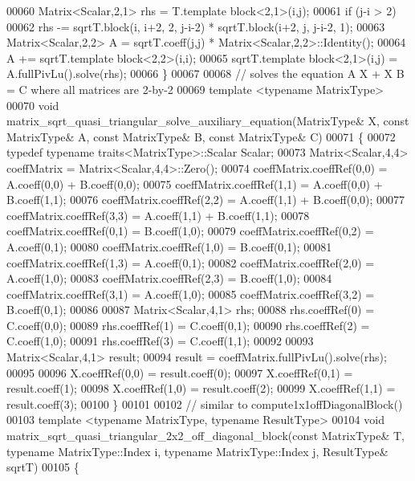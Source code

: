 \begin{DoxyCode}
00060   Matrix<Scalar,2,1> rhs = T.template block<2,1>(i,j);
00061   \textcolor{keywordflow}{if} (j-i > 2)
00062     rhs -= sqrtT.block(i, i+2, 2, j-i-2) * sqrtT.block(i+2, j, j-i-2, 1);
00063   Matrix<Scalar,2,2> A = sqrtT.coeff(j,j) * Matrix<Scalar,2,2>::Identity();
00064   A += sqrtT.template block<2,2>(i,i);
00065   sqrtT.template block<2,1>(i,j) = A.fullPivLu().solve(rhs);
00066 \}
00067 
00068 \textcolor{comment}{// solves the equation A X + X B = C where all matrices are 2-by-2}
00069 \textcolor{keyword}{template} <\textcolor{keyword}{typename} MatrixType>
00070 \textcolor{keywordtype}{void} matrix\_sqrt\_quasi\_triangular\_solve\_auxiliary\_equation(MatrixType& X, \textcolor{keyword}{const} MatrixType& A, \textcolor{keyword}{const} 
      MatrixType& B, \textcolor{keyword}{const} MatrixType& C)
00071 \{
00072   \textcolor{keyword}{typedef} \textcolor{keyword}{typename} traits<MatrixType>::Scalar Scalar;
00073   Matrix<Scalar,4,4> coeffMatrix = Matrix<Scalar,4,4>::Zero();
00074   coeffMatrix.coeffRef(0,0) = A.coeff(0,0) + B.coeff(0,0);
00075   coeffMatrix.coeffRef(1,1) = A.coeff(0,0) + B.coeff(1,1);
00076   coeffMatrix.coeffRef(2,2) = A.coeff(1,1) + B.coeff(0,0);
00077   coeffMatrix.coeffRef(3,3) = A.coeff(1,1) + B.coeff(1,1);
00078   coeffMatrix.coeffRef(0,1) = B.coeff(1,0);
00079   coeffMatrix.coeffRef(0,2) = A.coeff(0,1);
00080   coeffMatrix.coeffRef(1,0) = B.coeff(0,1);
00081   coeffMatrix.coeffRef(1,3) = A.coeff(0,1);
00082   coeffMatrix.coeffRef(2,0) = A.coeff(1,0);
00083   coeffMatrix.coeffRef(2,3) = B.coeff(1,0);
00084   coeffMatrix.coeffRef(3,1) = A.coeff(1,0);
00085   coeffMatrix.coeffRef(3,2) = B.coeff(0,1);
00086 
00087   Matrix<Scalar,4,1> rhs;
00088   rhs.coeffRef(0) = C.coeff(0,0);
00089   rhs.coeffRef(1) = C.coeff(0,1);
00090   rhs.coeffRef(2) = C.coeff(1,0);
00091   rhs.coeffRef(3) = C.coeff(1,1);
00092 
00093   Matrix<Scalar,4,1> result;
00094   result = coeffMatrix.fullPivLu().solve(rhs);
00095 
00096   X.coeffRef(0,0) = result.coeff(0);
00097   X.coeffRef(0,1) = result.coeff(1);
00098   X.coeffRef(1,0) = result.coeff(2);
00099   X.coeffRef(1,1) = result.coeff(3);
00100 \}
00101 
00102 \textcolor{comment}{// similar to compute1x1offDiagonalBlock()}
00103 \textcolor{keyword}{template} <\textcolor{keyword}{typename} MatrixType, \textcolor{keyword}{typename} ResultType>
00104 \textcolor{keywordtype}{void} matrix\_sqrt\_quasi\_triangular\_2x2\_off\_diagonal\_block(\textcolor{keyword}{const} MatrixType& T, \textcolor{keyword}{typename} MatrixType::Index i,
       \textcolor{keyword}{typename} MatrixType::Index j, ResultType& sqrtT)
00105 \{

\end{DoxyCode}
